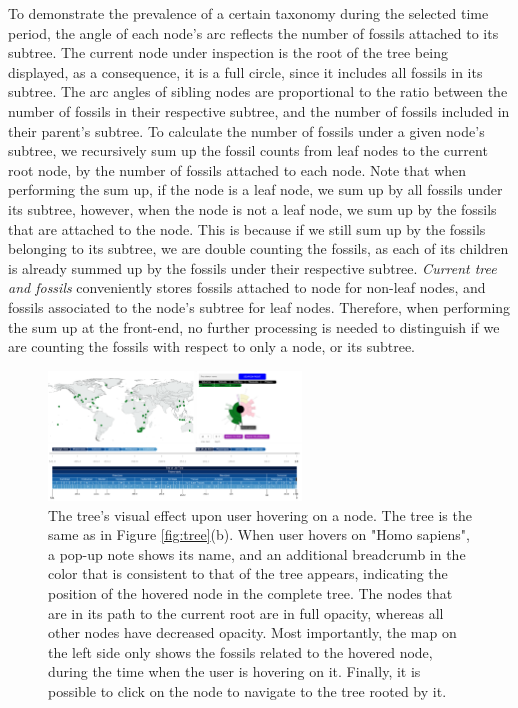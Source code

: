 \documentclass[11pt, a4paper,oneside,chapterprefix=false]{scrbook}
\begin{document}
To demonstrate the prevalence of a certain taxonomy during the selected time period, the angle of each node's arc reflects the number of fossils attached to its subtree. The current node under inspection is the root of the tree being displayed, as a consequence, it is a full circle, since it includes all fossils in its subtree. The arc angles of sibling nodes are proportional to the ratio between the number of fossils in their respective subtree, and the number of fossils included in their parent's subtree. To calculate the number of fossils under a given node's subtree, we recursively sum up the fossil counts from leaf nodes to the current root node, by the number of fossils attached to each node. Note that when performing the sum up, if the node is a leaf node, we sum up by all fossils under its subtree, however, when the node is not a leaf node, we sum up by the fossils that are attached to the node. This is because if we still sum up by the fossils belonging to its subtree, we are double counting the fossils, as each of its children is already summed up by the fossils under their respective subtree. \emph{Current tree and fossils} conveniently stores fossils attached to node for non-leaf nodes, and fossils associated to the node's subtree for leaf nodes. Therefore, when performing the sum up at the front-end, no further processing is needed to distinguish if we are counting the fossils with respect to only a node, or its subtree. \\
\begin{figure}[h]
	\centering
	\includegraphics[width=0.6\textwidth]{figures/technical_solution/tree/tree_hover}
	\caption{The tree's visual effect upon user hovering on a node. The tree is the same as in Figure \ref{fig:tree}(b). When user hovers on "Homo sapiens", a pop-up note shows its name, and an additional breadcrumb in the color that is consistent to that of the tree appears, indicating the position of the hovered node in the complete tree. The nodes that are in its path to the current root are in full opacity, whereas all other nodes have decreased opacity. Most importantly, the map on the left side only shows the fossils related to the hovered node, during the time when the user is hovering on it. Finally, it is possible to click on the node to navigate to the tree rooted by it. }
	\label{fig:tree_hover}
\end{figure}
\end{document}
